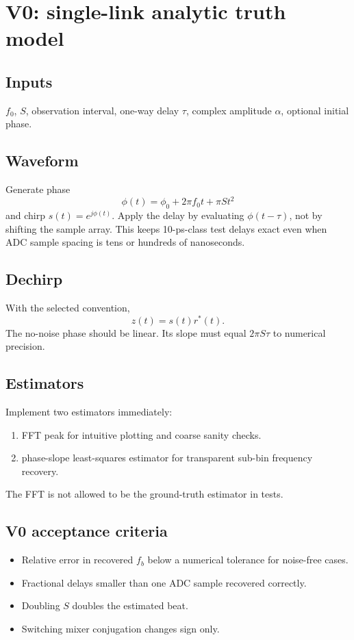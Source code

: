 \documentclass[11pt]{article}
\begin{document}
\section{V0: single-link analytic truth model}
\subsection{Inputs}
$f_0$, $S$, observation interval, one-way delay $\tau$, complex amplitude $\alpha$, optional initial phase.

\subsection{Waveform}
Generate phase
\[
\phi(t)=\phi_0+2\pi f_0t+\pi St^2
\]
and chirp $s(t)=e^{j\phi(t)}$. Apply the delay by evaluating $\phi(t-\tau)$, not by shifting the sample array. This keeps 10-ps-class test delays exact even when ADC sample spacing is tens or hundreds of nanoseconds.

\subsection{Dechirp}
With the selected convention,
\[
z(t)=s(t)r^*(t).
\]
The no-noise phase should be linear. Its slope must equal $2\pi S\tau$ to numerical precision.

\subsection{Estimators}
Implement two estimators immediately:
\begin{enumerate}
\item FFT peak for intuitive plotting and coarse sanity checks.
\item phase-slope least-squares estimator for transparent sub-bin frequency recovery.
\end{enumerate}
The FFT is not allowed to be the ground-truth estimator in tests.

\subsection{V0 acceptance criteria}
\begin{itemize}
\item Relative error in recovered $f_b$ below a numerical tolerance for noise-free cases.
\item Fractional delays smaller than one ADC sample recovered correctly.
\item Doubling $S$ doubles the estimated beat.
\item Switching mixer conjugation changes sign only.
\end{itemize}
\end{document}
